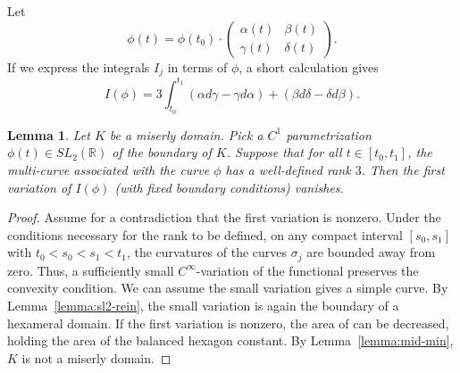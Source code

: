 \documentclass[11pt]{amsart}
\newtheorem{lemma}[equation]{Lemma}
\newcommand{\ring}[1]{\mathbb{#1}}
\begin{document}
Let 
\[
\phi(t) = \phi(t_0)\cdot 
\begin{pmatrix} \alpha(t) & \beta(t) \\ \gamma(t) & \delta (t) \end{pmatrix}.
\]
If we express the integrals $I_j$ in terms of $\phi$, a short calculation gives
\begin{equation}\label{eqn:area-int}
I(\phi) = 3\int_{t_0}^{t_1} 
(\alpha d\gamma - \gamma d\alpha) + (\beta d\delta - \delta d\beta).
\end{equation}



\begin{lemma} Let $K$ be a miserly domain.  Pick a $C^1$
  parametrization $\phi(t)\in SL_2(\ring{R})$ of the boundary of $K$.
  Suppose that for all $t\in[t_0,t_1]$, the multi-curve associated
  with the curve $\phi$ has a well-defined rank $3$.  Then the first
  variation of $I(\phi)$ (with fixed boundary conditions) vanishes.
\end{lemma}

\begin{proof} Assume for a contradiction that the first variation is
  nonzero. Under the conditions necessary for the rank to be defined,
  on any compact interval $[s_0,s_1]$ with $t_0 < s_0 < s_1 < t_1$,
  the curvatures of the curves $\sigma_j$ are bounded away from zero.
  Thus, a sufficiently small $C^\infty$-variation of the functional
  preserves the convexity condition.  We can assume the small
  variation gives a simple curve.  By Lemma~\ref{lemma:sl2-rein}, the
  small variation is again the boundary of a hexameral domain.  If the
  first variation is nonzero, the area of can be decreased, holding
  the area of the balanced hexagon constant.  By
  Lemma~\ref{lemma:mid-min}, $K$ is not a miserly domain.
\end{proof}
\end{document}
